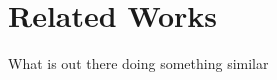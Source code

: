 \chapter{Related Works}\label{cha:related_works}
\pagestyle{scrheadings}




What is out there doing something similar 
